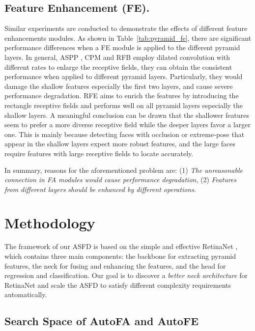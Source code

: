 \documentclass[sigconf]{acmart}
\begin{document}
\subsection{Feature Enhancement (FE).}
Similar experiments are conducted to demonstrate the effects of different feature enhancements modules. As shown in Table~\ref{tab:pyramid_fe}, there are significant performance differences when a FE module is applied to the different pyramid layers. 
In general, ASPP \cite{chen2017aspp,qiao2020detectors}, CPM \cite{li2019dsfd,tang2018pyramidbox} and RFB \cite{liu2018rfb} employ dilated convolution with different rates to enlarge the receptive fields, they can obtain the consistent performance when applied to different pyramid layers. Particularly, they would damage the shallow features especially the first two layers, and cause severe performance degradation.
RFE \cite{zhang2020refineface} aims to enrich the features by introducing the rectangle receptive fields and performs well on all pyramid layers especially the shallow layers. 
A meaningful conclusion can be drawn that the shallower features seem to prefer a more diverse receptive field while the deeper layers favor a larger one. 
This is mainly because detecting faces with occlusion or extreme-pose that appear in the shallow layers expect more robust features, and the large faces require features with large receptive fields to locate accurately.

In summary, reasons for the aforementioned problem are: (1) \textit{The unreasonable connection in FA modules would cause performance degradation}, (2) \textit{Features from different layers should be enhanced by different operations}.





\section{Methodology}
The framework of our ASFD is based on the simple and effective RetinaNet \cite{lin2017focal}, which contains three main components: the backbone for extracting pyramid features, the neck for fusing and enhancing the features, and the head for regression and classification. Our goal is to discover a \textit{better neck architecture} for RetinaNet and scale the ASFD to satisfy different complexity requirements automatically. 

\subsection{Search Space of AutoFA and AutoFE}
\end{document}
